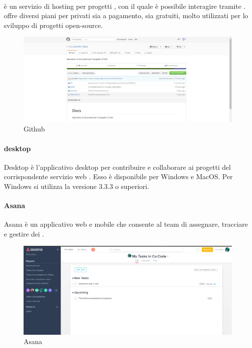  \paragraph{}
  è un servizio di hosting per progetti , con il quale è possibile interagire tramite . 
offre diversi piani per  privati sia a pagamento, sia gratuiti, molto utilizzati per lo
sviluppo di progetti open-source. 
\begin{figure}[h]
\centering
\includegraphics[scale=0.4]{img/github.png}
\caption{Github}\label{sec:Figura4}
\end{figure}
 \paragraph{ desktop}
  Desktop è l'applicativo desktop per contribuire e collaborare ai progetti del corrispondente servizio web . Esso è disponibile per Windows e MacOS. Per Windows si utilizza la versione 3.3.3 o superiori.
 \paragraph{Asana}
 Asana è un applicativo web e mobile che consente al team di assegnare, tracciare e gestire dei .
\begin{figure}[h]
\centering
\includegraphics[scale=0.4]{img/asana.png}
\caption{Asana}\label{sec:Figura5}
\end{figure}
